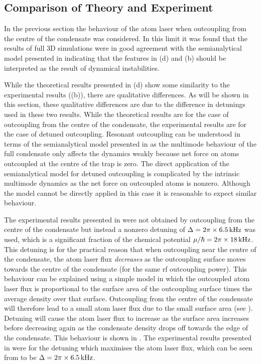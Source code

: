 \subsection{Comparison of Theory and Experiment}

In the previous section the behaviour of the atom laser when outcoupling from the centre of the condensate was considered. In this limit it was found that the results of full 3D simulations were in good agreement with the semianalytical model presented in  indicating that the features in (d) and (b) should be interpreted as the result of dynamical instabilities. 

While the theoretical results presented in (d) show some similarity to the experimental results ((b)), there are qualitative differences. As will be shown in this section, these qualitative differences are due to the difference in detunings used in these two results. While the theoretical results are for the case of outcoupling from the centre of the condensate, the experimental results are for the case of detuned outcoupling. Resonant outcoupling can be understood in terms of the semianalytical model presented in  as the multimode behaviour of the full condensate only affects the dynamics weakly because net force on atoms outcoupled at the centre of the trap is zero. The direct application of the semianalytical model for detuned outcoupling is complicated by the intrinsic multimode dynamics as the net force on outcoupled atoms is nonzero. Although the model cannot be directly applied in this case it is reasonable to expect similar behaviour.

The experimental results presented in  were not obtained by outcoupling from the centre of the condensate but instead a nonzero detuning of $\Delta = 2 \pi \times \unit[6.5]{kHz}$ was used, which is a significant fraction of the chemical potential $\mu/\hbar = 2\pi \times \unit[18]{kHz}$. This detuning is for the practical reason that when outcoupling near the centre of the condensate, the atom laser flux \emph{decreases} as the outcoupling surface moves towards the centre of the condensate (for the same rf outcoupling power). This behaviour can be explained using a simple model in which the  outcoupled atom laser flux is proportional to the surface area of the outcoupling surface times the average density over that surface. Outcoupling from the centre of the condensate will therefore lead to a small atom laser flux due to the small surface area (see ). Detuning will cause the atom laser flux to increase as the surface area increases before decreasing again as the condensate density drops off towards the edge of the condensate. This behaviour is shown in . The experimental results presented in  were for the detuning which maximises the atom laser flux, which can be seen from  to be $\Delta = 2\pi \times \unit[6.5]{kHz}$.

